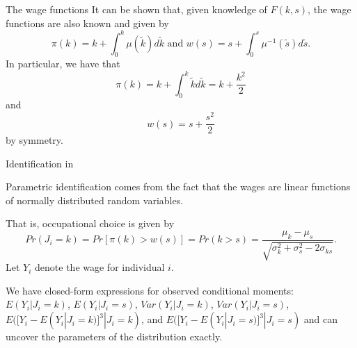 \documentclass[aspectratio=169]{beamer}
\begin{document}
\begin{frame}{The wage functions}
	 It can be shown that, given knowledge of $F(k,s)$, the wage functions are also known and given by
	\begin{equation*}
		\pi(k) = k + \int_0^k\mu(\tilde{k})d\tilde{k} \text{ and } w(s) = s + \int_0^s\mu^{-1}(\tilde{s})d\tilde{s}.
	\end{equation*}
 	In particular, we have that
	\begin{equation*}
		\pi(k) = k + \int_0^k\tilde{k}d\tilde{k} = k +\frac{k^2}{2}
	\end{equation*}
	and 
	\begin{equation*}
		w(s) = s + \frac{s^2}{2}
	\end{equation*}
	by symmetry.
\end{frame}


\begin{frame}{Identification in \citet{heckman1990empirical}}
	
Parametric identification comes from the fact that the wages are linear functions of normally distributed random variables. 

\vspace{0.2cm}

That is, occupational choice is given by
\begin{equation*}
Pr(J_i = k)=	Pr[\pi(k)>w(s)] = Pr(k>s) = \frac{\mu_k - \mu_s}{\sqrt{\sigma_k^2 + \sigma_s^2 - 2\sigma_{ks}}}.
\end{equation*}
Let $Y_i$ denote the wage for individual $i$. 

\vspace{0.5cm}

 We have closed-form expressions for observed conditional moments: $E(Y_i | J_i = k)$, $E(Y_i | J_i = s)$, $Var(Y_i | J_i = k)$, $Var(Y_i | J_i = s)$, $E([Y_i - E(Y_i|J_i = k)]^3|J_i = k)$, and $E([Y_i - E(Y_i|J_i = s)]^3|J_i = s)$ and can uncover the parameters of the distribution exactly.

\end{frame}
\end{document}
